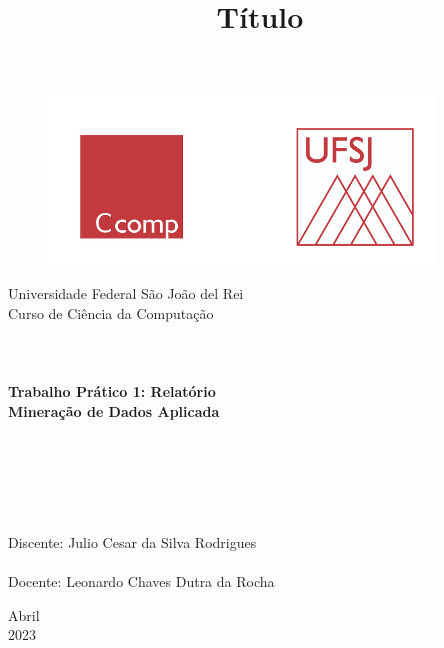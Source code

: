 \documentclass[a4paper, 12pt]{article}
\begin{document}

\begin{titlepage}
	\begin{center}
	
	\begin{figure}[ht]
    \centering
    \includegraphics[width=.44\textwidth]{Images/LogoUFSJ.PNG}
    \label{fig:Capturar.PNG}
    \end{figure}

    	\Huge{Universidade Federal São João del Rei}\\
		\Large{Curso de Ciência da Computação}\\ 

        \vspace{110pt}
        \textbf{\LARGE{
        \\
        \\
        \\
        Trabalho Prático 1: Relatório\\
        \vspace{0.5cm}
        \Large{Mineração de Dados Aplicada}
        \\
        \\
        \\
        }}
        
		\title{{\large{Título}}}
		\vspace{2.5cm}
	\end{center}
	    
    \begin{flushleft}
		\begin{tabbing}
		\\
		\\
		\\	
		\large{Discente: Julio Cesar da Silva Rodrigues}\\
	    \\
		\large{Docente: Leonardo Chaves Dutra da Rocha}\\
	    \end{tabbing}
    \end{flushleft}
	\vspace{1cm}
	
	\begin{center}
		\vspace{\fill}
			Abril\\
		    2023
	\end{center}
\end{titlepage}
\end{document}
